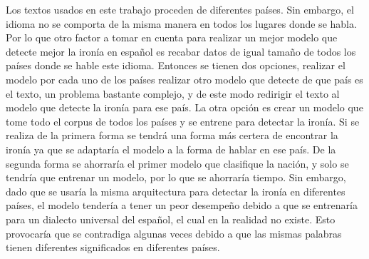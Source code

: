 \par Los textos usados en este trabajo proceden de diferentes países. Sin embargo, el idioma no se comporta de la misma manera en todos los lugares donde se habla. Por lo que otro factor a tomar en cuenta para realizar un mejor modelo que detecte mejor la ironía en español es recabar datos de igual tamaño de todos los países donde se hable este idioma. Entonces se tienen dos opciones, realizar el modelo por cada uno de los países realizar otro modelo que detecte de que país es el texto, un problema bastante complejo, y de este modo redirigir el texto al modelo que detecte la ironía para ese país. La otra opción es crear un modelo que tome todo el corpus de todos los países y se entrene para detectar la ironía. Si se realiza de la primera forma se tendrá una forma más certera de encontrar la ironía ya que se adaptaría el modelo a la forma de hablar en ese país. De la segunda forma se ahorraría el primer modelo que clasifique la nación, y solo se tendría que entrenar un modelo, por lo que se ahorraría tiempo. Sin embargo, dado que se usaría la misma arquitectura para detectar la ironía en diferentes países, el modelo tendería a tener un peor desempeño debido a que se entrenaría para un dialecto universal del español, el cual en la realidad no existe. Esto provocaría que se contradiga algunas veces debido a que las mismas palabras tienen diferentes significados en diferentes países.
